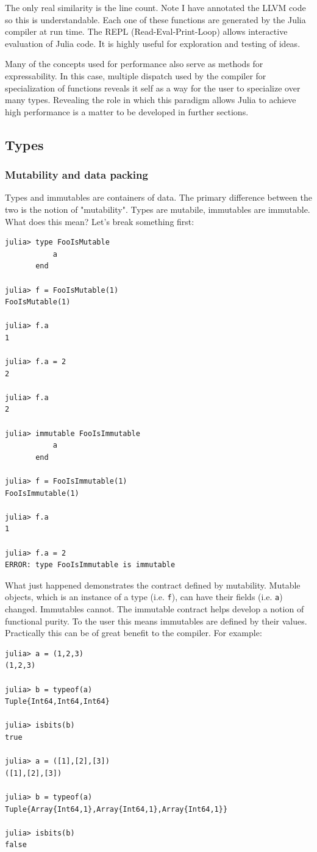 \documentclass[a4paper]{article}
\begin{document}
The only real similarity is the line count. Note I have annotated the LLVM code
so this is understandable. Each one of these functions are generated by the
Julia compiler at run time. The REPL (Read-Eval-Print-Loop) allows interactive
evaluation of Julia code. It is highly useful for exploration and testing of
ideas.

Many of the concepts used for performance also serve as methods for
expressability. In this case, multiple dispatch used by the compiler for
specialization of functions reveals it self as a way for the user to
specialize over many types.
Revealing the role in which this paradigm allows Julia to achieve high
performance is a matter to be developed in further sections.

\subsection{Types}

\subsubsection{Mutability and data packing}
Types and immutables are containers of data. The primary difference between
the two is the notion of "mutability". Types are mutabile, immutables are 
immutable. What does this mean? Let's break something first:
\begin{lstlisting}
julia> type FooIsMutable
           a
       end

julia> f = FooIsMutable(1)
FooIsMutable(1)

julia> f.a
1

julia> f.a = 2
2

julia> f.a
2

julia> immutable FooIsImmutable
           a
       end

julia> f = FooIsImmutable(1)
FooIsImmutable(1)

julia> f.a
1

julia> f.a = 2
ERROR: type FooIsImmutable is immutable
\end{lstlisting}

What just happened demonstrates the contract defined by mutability. Mutable
objects, which is an instance of a type (i.e. \texttt{f}), can have their fields
(i.e. \texttt{a}) changed. Immutables cannot. The immutable contract helps develop
a notion of functional purity. To the user this means immutables are defined
by their values. Practically this can be of great benefit to
the compiler. For example:
\begin{lstlisting}
julia> a = (1,2,3)
(1,2,3)

julia> b = typeof(a)
Tuple{Int64,Int64,Int64}

julia> isbits(b)
true

julia> a = ([1],[2],[3])
([1],[2],[3])

julia> b = typeof(a)
Tuple{Array{Int64,1},Array{Int64,1},Array{Int64,1}}

julia> isbits(b)
false
\end{lstlisting}
\end{document}
